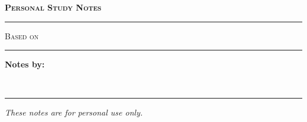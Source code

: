 
\begin{titlepage}
  \centering
  
  \vspace*{1.5cm}
  
  {\Large \scshape \textbf{Personal Study Notes} \par}
  
  \vspace{0.3cm}
  \rule{0.3\textwidth}{0.4pt}
  \vspace{1cm}
  
  {\Large \CourseName \par}
  
  \vspace{0.5cm}
  
  {\Large \textsc{Based on} \par}
  {\Huge \bfseries \TextbookTitle \par}
  
  \vspace{0.5cm}
  
  {\Large \itshape \TextbookAuthor \par}
  
  \vspace{1.5cm}
  
  \rule{0.5\textwidth}{0.4pt}
  
  \vspace{1cm}
  
  {\Large \textbf{Notes by:} \YourName \par}
  
  \vspace{0.3cm}
  
  {\large \NoteSemester\ \NoteYear \par}
  
  \vfill
  
  \rule{0.8\textwidth}{0.4pt}
  \vspace{0.2cm}
  
  {\small \textit{These notes are for personal use only.}}
  
\end{titlepage}


